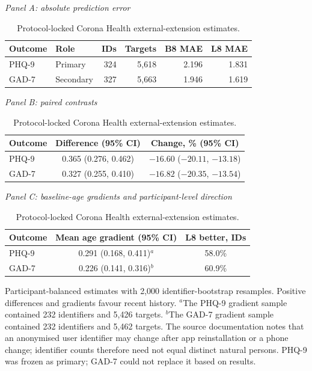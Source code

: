 \documentclass[pdflatex,sn-vancouver-num]{sn-jnl}
\begin{document}
\begin{table}[!htbp]
\caption{Protocol-locked Corona Health external-extension estimates.}\label{tab:s21}
\centering\footnotesize
{\itshape Panel A: absolute prediction error}\par\smallskip
\begin{tabular}{@{}llrrrr@{}}
\toprule
Outcome & Role & IDs & Targets & B8 MAE & L8 MAE\\
\midrule
PHQ-9 & Primary & 324 & 5,618 & 2.196 & 1.831\\
GAD-7 & Secondary & 327 & 5,663 & 1.946 & 1.619\\
\bottomrule
\end{tabular}
\par\medskip
{\itshape Panel B: paired contrasts}\par\smallskip
\begin{tabular}{@{}lcc@{}}
\toprule
Outcome & Difference (95\% CI) & Change, \% (95\% CI)\\
\midrule
PHQ-9 & 0.365 (0.276, 0.462) & $-16.60$ ($-20.11$, $-13.18$)\\
GAD-7 & 0.327 (0.255, 0.410) & $-16.82$ ($-20.35$, $-13.54$)\\
\bottomrule
\end{tabular}
\par\medskip
{\itshape Panel C: baseline-age gradients and participant-level direction}\par\smallskip
\begin{tabular}{@{}lcc@{}}
\toprule
Outcome & Mean age gradient (95\% CI) & L8 better, IDs\\
\midrule
PHQ-9 & 0.291 (0.168, 0.411)$^{a}$ & 58.0\%\\
GAD-7 & 0.226 (0.141, 0.316)$^{b}$ & 60.9\%\\
\bottomrule
\end{tabular}
\begin{flushleft}\footnotesize Participant-balanced estimates with 2,000 identifier-bootstrap resamples. Positive differences and gradients favour recent history. $^{a}$The PHQ-9 gradient sample contained 232 identifiers and 5,426 targets. $^{b}$The GAD-7 gradient sample contained 232 identifiers and 5,462 targets. The source documentation notes that an anonymised user identifier may change after app reinstallation or a phone change; identifier counts therefore need not equal distinct natural persons. PHQ-9 was frozen as primary; GAD-7 could not replace it based on results.\end{flushleft}
\end{table}
\end{document}
